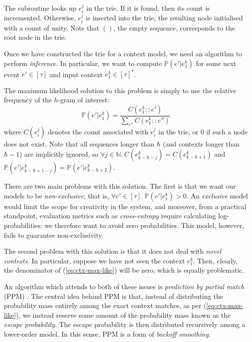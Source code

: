 \documentclass[12pt,a4paper,twoside,openright]{report}
\begin{document}
The subroutine  looks up $e_i^j$ in the trie. If
it is found, then its count is incremented. Otherwise, $e_i^j$ is inserted into
the trie, the resulting node initialised with a count of unity. Note that $()$,
the empty sequence, corresponds to the root node in the trie.

Once we have constructed the trie for a context model, we need an algorithm to
perform \emph{inference}. In particular, we want to compute $\mathbb{P}(e' |
e_1^k)$ for some next event $e' \in [\tau]$ and input context $e_1^k \in
[\tau]^*$.

The maximum likelihood solution to this problem is simply to use the relative
frequency of the $h$-gram of interest:
\begin{equation}
  \mathbb{P}(e'|e_1^k) = \frac{ C(e_1^k::e') }{ \sum_{e''} C(e_1^k::e'') }
  \label{eq:ctx-max-like}
\end{equation}
where $C(e_i^j)$ denotes the count associated with $e_i^j$ in the trie, or $0$
if such a node does not exist. Note that all sequences longer than $\hbar$ (and
contexts longer than $\hbar-1$) are implicitly ignored, so $\forall j \in
\mathbb{N}.\ C(e_{k-\hbar-j}^k) = C(e_{k-\hbar+1}^k)$ and
$\mathbb{P}(e'|e_{k-\hbar+1-j}^k) = \mathbb{P}(e'|e_{k-\hbar+2}^k)$.

There are two main problems with this solution. The first is that we want our
models to be \emph{non-exclusive}; that is, $\forall e' \in [\tau].\
\mathbb{P}(e' | e_1^k) > 0$. An \emph{exclusive} model would limit the scope for
creativity in the system, and moreover, from a practical standpoint, evaluation
metrics such as \emph{cross-entropy} require calculating log-probabilities: we
therefore want to avoid zero probabilities. This model, however, fails to
guarantee non-exclusivity.

The second problem with this solution is that it does not deal with \emph{novel
contexts}. In particular, suppose we have not seen the context $e_1^k$. Then,
clearly, the denominator of (\ref{eq:ctx-max-like}) will be zero, which is
equally problematic.

An algorithm which attends to both of these issues is \emph{prediction by
partial match} (PPM) \cite{cleary1984ppm}. The central idea behind PPM is that,
instead of distributing the probability mass entirely among the exact context
matches, as per (\ref{eq:ctx-max-like}), we instead reserve some amount of the
probability mass known as the \emph{escape probability}. The escape probability
is then distributed recursively among a lower-order model. In this sense, PPM
is a form of \emph{backoff smoothing}.
\end{document}
